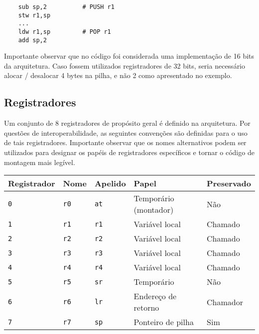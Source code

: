 \documentclass{extreport}
\begin{document}
\begin{verbatim}
    sub sp,2          # PUSH r1
    stw r1,sp
    ...
    ldw r1,sp         # POP r1
    add sp,2
\end{verbatim}

Importante observar que no código foi considerada uma implementação de 16 bits da arquitetura. Caso fossem utilizados registradores de 32 bits, seria necessário alocar / desalocar 4 bytes na pilha, e não 2 como apresentado no exemplo.

\subsection{Registradores}
\label{ref:regs}
Um conjunto de 8 registradores de propósito geral é definido na arquitetura. Por questões de interoperabilidade, as seguintes convenções são definidas para o uso de tais registradores. Importante observar que os nomes alternativos podem ser utilizados para designar os papéis de registradores específicos e tornar o código de montagem mais legível.

\begin{table}[ht!]
\centering
\begin{tabular}{|p{2.5cm}|p{1.6cm}|p{1.6cm}|p{4.3cm}|p{2.5cm}|}
\hline
\bf{Registrador} & \bf{Nome} & \bf{Apelido} & \bf{Papel} & \bf{Preservado} \\ \hline \hline
\texttt{0}	& \texttt{r0}	& \texttt{at}	& Temporário (montador) & Não \\ \hline
\texttt{1}	& \texttt{r1}	& \texttt{r1}	& Variável local & Chamado \\ \hline
\texttt{2}	& \texttt{r2}	& \texttt{r2}	& Variável local & Chamado \\ \hline
\texttt{3}	& \texttt{r3}	& \texttt{r3}	& Variável local & Chamado \\ \hline
\texttt{4}	& \texttt{r4}	& \texttt{r4}	& Variável local & Chamado \\ \hline
\texttt{5}	& \texttt{r5}	& \texttt{sr}	& Temporário & Não \\ \hline
\texttt{6}	& \texttt{r6}	& \texttt{lr}	& Endereço de retorno & Chamador \\ \hline
\texttt{7}	& \texttt{r7}	& \texttt{sp}	& Ponteiro de pilha & Sim \\ \hline
\end{tabular}
\end{table}
\end{document}
